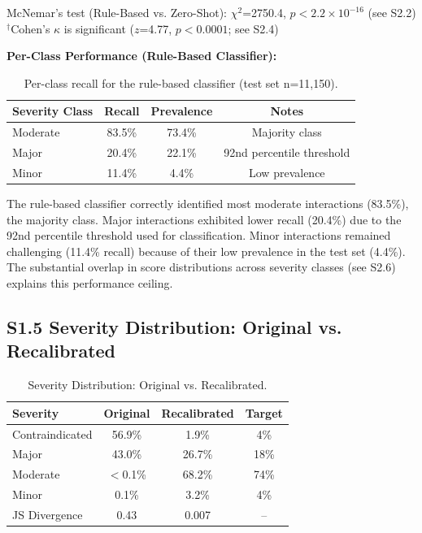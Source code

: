 \documentclass[12pt,a4paper]{article}
\begin{document}
\noindent McNemar's test (Rule-Based vs. Zero-Shot): $\chi^2$=2750.4, $p < 2.2 \times 10^{-16}$ (see S2.2)\\
$^\dagger$Cohen's $\kappa$ is significant ($z$=4.77, $p < 0.0001$; see S2.4)

\bigskip
\noindent\textbf{Per-Class Performance (Rule-Based Classifier):}

\begin{table}[H]
\centering
\caption{Per-class recall for the rule-based classifier (test set n=11,150).}
\label{tab:per_class_recall}
\begin{tabular}{@{}lccc@{}}
\toprule
\textbf{Severity Class} & \textbf{Recall} & \textbf{Prevalence} & \textbf{Notes} \\
\midrule
Moderate & 83.5\% & 73.4\% & Majority class \\
Major & 20.4\% & 22.1\% & 92nd percentile threshold \\
Minor & 11.4\% & 4.4\% & Low prevalence \\
\bottomrule
\end{tabular}
\end{table}

\noindent The rule-based classifier correctly identified most moderate interactions (83.5\%), the majority class. Major interactions exhibited lower recall (20.4\%) due to the 92nd percentile threshold used for classification. Minor interactions remained challenging (11.4\% recall) because of their low prevalence in the test set (4.4\%). The substantial overlap in score distributions across severity classes (see S2.6) explains this performance ceiling.

\subsection{S1.5 Severity Distribution: Original vs. Recalibrated}

\begin{table}[H]
\centering
\caption{Severity Distribution: Original vs. Recalibrated.}
\label{tab:severity_distribution}
\begin{tabular}{@{}lccc@{}}
\toprule
\textbf{Severity} & \textbf{Original} & \textbf{Recalibrated} & \textbf{Target} \\
\midrule
Contraindicated & 56.9\% & 1.9\% & 4\% \\
Major & 43.0\% & 26.7\% & 18\% \\
Moderate & $<$0.1\% & 68.2\% & 74\% \\
Minor & 0.1\% & 3.2\% & 4\% \\
\midrule
JS Divergence & 0.43 & 0.007 & -- \\
\bottomrule
\end{tabular}
\end{table}
\end{document}
